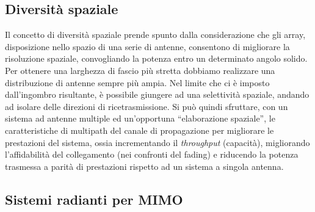 \documentclass[technote]{IEEEtran}
\begin{document}
\subsection{Diversità spaziale}

\par Il concetto di diversità spaziale \cite{Sarkar} prende spunto dalla considerazione che gli array, disposizione nello spazio di una serie di antenne, consentono di migliorare la risoluzione spaziale, convogliando la potenza entro un determinato angolo solido. Per ottenere una larghezza di fascio più stretta dobbiamo realizzare una distribuzione di antenne sempre più ampia. Nel limite che ci è imposto dall'ingombro risultante, è possibile giungere ad una selettività  spaziale, andando ad isolare delle direzioni di ricetrasmissione. Si può quindi sfruttare, con un sistema ad antenne multiple ed un'opportuna  ``elaborazione spaziale'', le caratteristiche di multipath del canale di propagazione per migliorare le prestazioni del sistema, ossia incrementando il \textit{throughput} (capacità), migliorando l'affidabilità  del collegamento (nei confronti del fading) e riducendo la potenza trasmessa a parità  di prestazioni rispetto ad un sistema a singola antenna.


\subsection{Sistemi radianti per MIMO}
\end{document}
